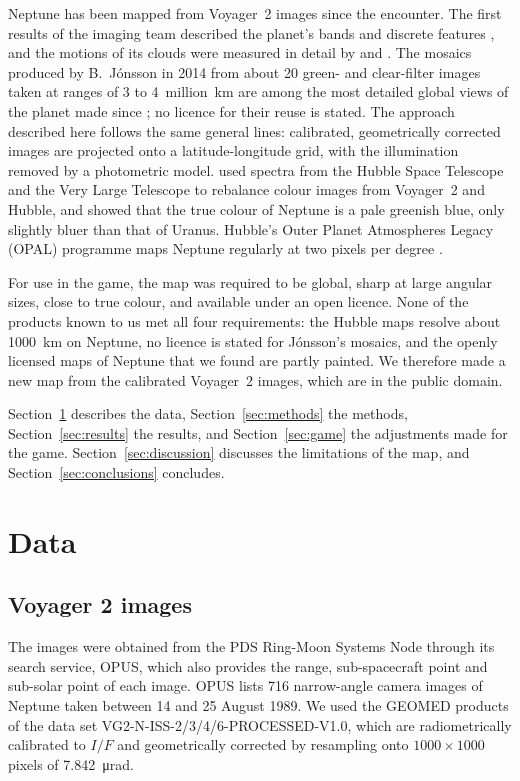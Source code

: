 \documentclass[11pt,a4paper]{article}
\begin{document}
Neptune has been mapped from Voyager~2 images since the encounter. The first results of the imaging
team described the planet's bands and discrete features \citep{smith1989}, and the motions of its
clouds were measured in detail by \citet{limaye1991} and \citet{sromovsky1993}. The mosaics
produced by B.~Jónsson in 2014 from about 20 green- and clear-filter images taken at ranges of 3 to
4~million~km are among the most detailed global views of the planet made since
\citep{lakdawalla2014}; no licence for their reuse is stated. The approach described here follows
the same general lines: calibrated, geometrically corrected images are projected onto a
latitude-longitude grid, with the illumination removed by a photometric model.
\citet{irwin2024} used spectra from the Hubble Space Telescope and the Very Large Telescope to
rebalance colour images from Voyager~2 and Hubble, and showed that the true colour of Neptune is a
pale greenish blue, only slightly bluer than that of Uranus. Hubble's Outer Planet Atmospheres
Legacy (OPAL) programme maps Neptune regularly at two pixels per degree
\citep{simon2015,opal}.

For use in the game, the map was required to be global, sharp at large angular sizes, close to
true colour, and available under an open licence. None of the products known to us met all four
requirements: the Hubble maps resolve about 1000~km on Neptune, no licence is stated for Jónsson's
mosaics, and the openly licensed maps of Neptune that we found are partly painted. We therefore
made a new map from the calibrated Voyager~2 images, which are in the public domain.

Section~\ref{sec:data} describes the data, Section~\ref{sec:methods} the methods,
Section~\ref{sec:results} the results, and Section~\ref{sec:game} the adjustments made for the
game. Section~\ref{sec:discussion} discusses the limitations of the map, and
Section~\ref{sec:conclusions} concludes.

\section{Data}\label{sec:data}

\subsection{Voyager 2 images}

The images were obtained from the PDS Ring-Moon Systems Node through its search service, OPUS,
which also provides the range, sub-spacecraft point and sub-solar point of each image. OPUS lists
716 narrow-angle camera images of Neptune taken between 14 and 25 August 1989. We used the GEOMED
products of the data set VG2-N-ISS-2/3/4/6-PROCESSED-V1.0, which are radiometrically calibrated to
$I/F$ \citep[the calibration of the cameras is described by][]{danielson1981} and geometrically
corrected by resampling onto $1000\times1000$ pixels of \SI{7.842}{\micro\radian}.
\end{document}
